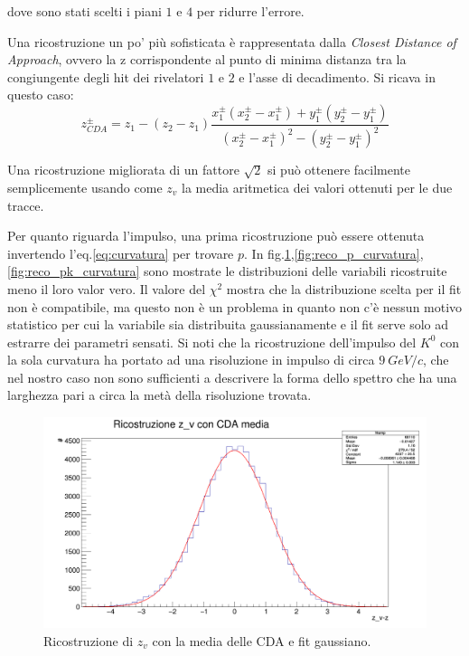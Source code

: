 \documentclass[8pt]{extarticle}
\begin{document}
dove sono stati scelti i piani $1$ e $4$ per ridurre l'errore.

Una ricostruzione un po' più sofisticata è rappresentata dalla \textit{Closest Distance of Approach}, ovvero la z corrispondente al punto di minima distanza tra la congiungente degli hit dei rivelatori $1$ e $2$ e l'asse di decadimento. Si ricava in questo caso:
$$
z_{CDA}^{\pm} = z_1 - (z_2-z_1)\frac{x_1^{\pm}(x_2^{\pm}-x_1^{\pm}) + y_1^{\pm}(y_2^{\pm} - y_1^{\pm})}{(x_2^{\pm}-x_1^{\pm})^2-(y_2^{\pm}-y_1^{\pm})^2}
$$

Una ricostruzione migliorata di un fattore $\sqrt{2}$ si può ottenere facilmente semplicemente usando come $z_v$ la media aritmetica dei valori ottenuti per le due tracce. \medskip

Per quanto riguarda l'impulso, una prima ricostruzione può essere ottenuta invertendo l'eq.\ref{eq:curvatura} per trovare $p$. In fig.\ref{fig:reco_zCDA},\ref{fig:reco_p_curvatura}, \ref{fig:reco_pk_curvatura} sono mostrate le distribuzioni delle variabili ricostruite meno il loro valor vero. Il valore del $\chi^2$ mostra che la distribuzione scelta per il fit non è compatibile, ma questo non è un problema in quanto non c'è nessun motivo statistico per cui la variabile sia distribuita gaussianamente e il fit serve solo ad estrarre dei parametri sensati. Si noti che la ricostruzione dell'impulso del $K^0$ con la sola curvatura ha portato ad una risoluzione in impulso di circa $9\ GeV/c$, che nel nostro caso non sono sufficienti a descrivere la forma dello spettro che ha una larghezza pari a circa la metà della risoluzione trovata.

\begin{figure}
	\begin{center}
		\includegraphics[scale=0.3]{reco_zCDA} 
		\caption{Ricostruzione di $z_v$ con la media delle CDA e fit gaussiano.}
		\label{fig:reco_zCDA}
	\end{center}
\end{figure}
\end{document}
